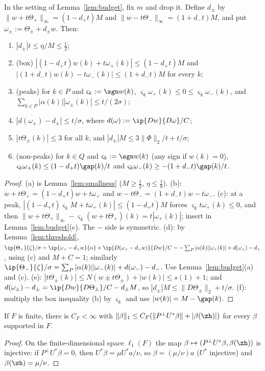 \begin{lemma}\label{lem:suplevel}
In the setting of Lemma~\ref{lem:budget}, fix $m$ and drop it.  Define
$d_\pm$ by $\|w+t\Theta_+\|_\infty=(1-d_+t)M$ and $\|w-t\Theta_-\|_\infty=
(1+d_-t)M$, and put $\omega_\pm:=\Theta_\pm+d_\pm w$.  Then:
\begin{enumerate}
\item[(a)] $|d_\pm|t\le\eta/M\le\frac12$;
\item[(b)] \textup{(box)} $|(1-d_+t)w(k)+t\omega_+(k)|\le(1-d_+t)M$ and
$|(1+d_-t)w(k)-t\omega_-(k)|\le(1+d_-t)M$ for every $k$;
\item[(c)] \textup{(peaks)} for $k\in P$ and $\varsigma_k:=\sgn w(k)$,
$\varsigma_k\omega_+(k)\le0\le\varsigma_k\omega_-(k)$, and
$\sum_{k\in P}|\alpha(k)||\omega_\pm(k)|\le t/(2\sigma)$;
\item[(d)] $|d(\omega_\pm)-d_\pm|\le t/\sigma$, where
$d(\omega):=\ip{Dw}{D\omega}/C$;
\item[(e)] $|t\Theta_\pm(k)|\le3$ for all $k$, and $|d_\pm|M\le3\|\Phi\|_2/t+
t/\sigma$;
\item[(f)] \textup{(non-peaks)} for $k\in Q$ and $\varsigma_k:=\sgn w(k)$ (any
sign if $w(k)=0$), $\varsigma_k\omega_+(k)\le(1-d_+t)\gap(k)/t$ and
$\varsigma_k\omega_-(k)\ge-(1+d_-t)\gap(k)/t$.
\end{enumerate}
\end{lemma}

\begin{proof}
(a) is Lemma~\ref{lem:smallness} ($M\ge\frac12$, $\eta\le\frac18$).  (b):
$w+t\Theta_+=(1-d_+t)w+t\omega_+$ and $w-t\Theta_-=(1+d_-t)w-t\omega_-$.
(c): at a peak, $|(1-d_+t)\varsigma_kM+t\omega_+(k)|\le(1-d_+t)M$ forces
$\varsigma_kt\omega_+(k)\le0$, and then $\|w+t\Theta_+\|_\infty-\varsigma_k
(w+t\Theta_+)(k)=t|\omega_+(k)|$; insert in Lemma~\ref{lem:budget}(c).  The
$-$ side is symmetric.  (d): by Lemma~\ref{lem:threshold},
$\ip{\Theta_+}{\zeta}/\sigma=\ip{\omega_+-d_+w}{\alpha}+\ip{D(\omega_+-d_+w)}
{Dw}/C=-\sum_P|\alpha(k)||\omega_+(k)|+d(\omega_+)-d_+$, using (c) and
$M+C=1$; similarly $\ip{\Theta_-}{\zeta}/\sigma=\sum_P|\alpha(k)||
\omega_-(k)|+d(\omega_-)-d_-$.  Use Lemma~\ref{lem:budget}(a) and (c).
(e): $|t\Theta_\pm(k)|\le N(w\pm t\Theta_\pm)+|w(k)|\le s(1)+1$; and
$d(\omega_\pm)-d_\pm=\ip{Dw}{D\Theta_\pm}/C-d_\pm M$, so $|d_\pm|M\le
\|D\Theta_\pm\|_2+t/\sigma$.  (f): multiply the box inequality (b) by
$\varsigma_k$ and use $|w(k)|=M-\gap(k)$.
\end{proof}

\begin{lemma}\label{lem:finitebase}
If $F$ is finite, there is $C_F<\infty$ with $\|\beta\|_1\le C_F(\|P^\perp
U^*\beta\|+|\beta(\zh)|)$ for every $\beta$ supported in $F$.
\end{lemma}

\begin{proof}
On the finite-dimensional space $\ell_1(F)$ the map $\beta\mapsto
(P^\perp U^*\beta,\beta(\zh))$ is injective: if $P^\perp U^*\beta=0$, then
$U^*\beta=\mu U^*a/\nu$, so $\beta=(\mu/\nu)a$ ($U^*$ injective) and
$\beta(\zh)=\mu/\nu$.
\end{proof}
